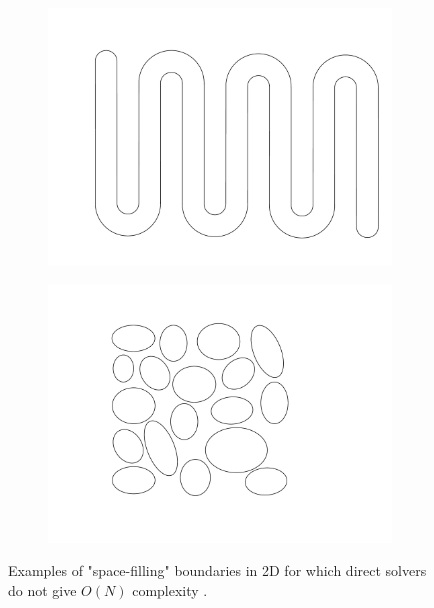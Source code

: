 \documentclass{sfuthesis}
\begin{document}
\begin{figure}[h]
        \centering
          \begin{subfigure}[b]{0.3\textwidth}
                \includegraphics[width=\textwidth]{SpaceFillingDomain1}
       \end{subfigure} \hspace{1cm}
        \begin{subfigure}[b]{0.2\textwidth}
        		\includegraphics[width=\textwidth]{SpaceFillingDomain2}
       \end{subfigure}
       \caption{Examples of "space-filling" boundaries in 2D for which direct solvers do not give $O(N)$ complexity \cite{CBMS, GillYoungMart2012}.}
       \label{fig: SpaceFillingDomains}
\end{figure}
\end{document}

